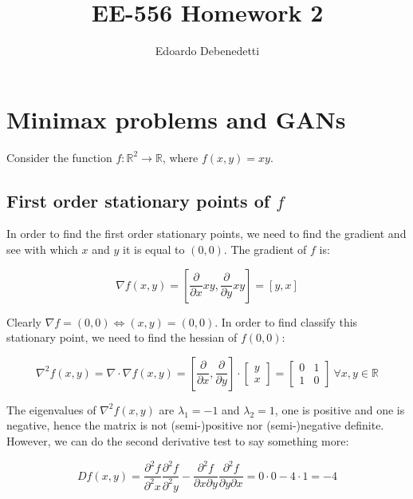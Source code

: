 \documentclass[12pt]{article}
\title{EE-556 Homework 2}
\author{Edoardo Debenedetti}
\begin{document}
\maketitle

\section{Minimax problems and GANs}

Consider the function $f : \mathbb{R}^2 \rightarrow \mathbb{R}$, where $f(x, y) = xy$.

\subsection{First order stationary points of $f$}
In order to find the first order stationary points, we need to find the gradient and see with which $x$ and $y$ it is equal to $(0, 0)$. The gradient of $f$ is:

\begin{equation} \label{eq:f_gradient}
    \nabla f(x, y) = \left [ \frac{\partial}{\partial x} xy, \frac{\partial}{\partial y} xy \right] = [y, x]
\end{equation}

Clearly $\nabla f = (0, 0) \iff (x, y) = (0, 0)$. In order to find classify this stationary point, we need to find the hessian of $f(0, 0)$:

\begin{equation} \label{eq:hessian_f}
    \nabla^2f(x, y) = \nabla \cdot \nabla f(x, y) =
        \left [ \frac{\partial}{\partial x}, \frac{\partial}{\partial y} \right]
        \cdot \begin{bmatrix} y \\ x \end{bmatrix} = 
        \begin{bmatrix} 0 & 1 \\ 1 & 0 \end{bmatrix} \ \forall x,  y \in \mathbb{R}
\end{equation}

The eigenvalues of $\nabla^2f(x, y)$ are $\lambda_{1} = -1$ and $\lambda_{2} = 1$, one is positive and one is negative, hence the matrix is not (semi-)positive nor (semi-)negative definite. However, we can do the second derivative test to say something more:

\begin{equation} \label{eq:f_hessian_det}
    Df(x, y) = \frac{\partial^2 f}{\partial^2 x} \frac{\partial^2 f}{\partial^2 y} - 
        \frac{\partial^2 f}{\partial x \partial y} \frac{\partial^2 f}{\partial y \partial x} = 0 \cdot 0 - 4 \cdot 1 = -4
\end{equation}
\end{document}
